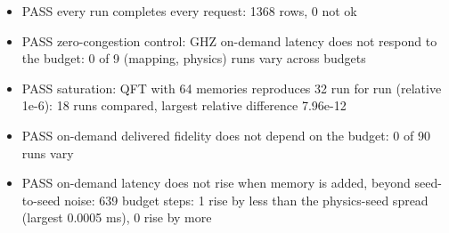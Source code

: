 \begin{itemize}
  \item PASS every run completes every request: 1368 rows, 0 not ok
  \item PASS zero-congestion control: GHZ on-demand latency does not respond to the budget: 0 of 9 (mapping, physics) runs vary across budgets
  \item PASS saturation: QFT with 64 memories reproduces 32 run for run (relative 1e-6): 18 runs compared, largest relative difference 7.96e-12
  \item PASS on-demand delivered fidelity does not depend on the budget: 0 of 90 runs vary
  \item PASS on-demand latency does not rise when memory is added, beyond seed-to-seed noise: 639 budget steps: 1 rise by less than the physics-seed spread (largest 0.0005 ms), 0 rise by more
\end{itemize}
